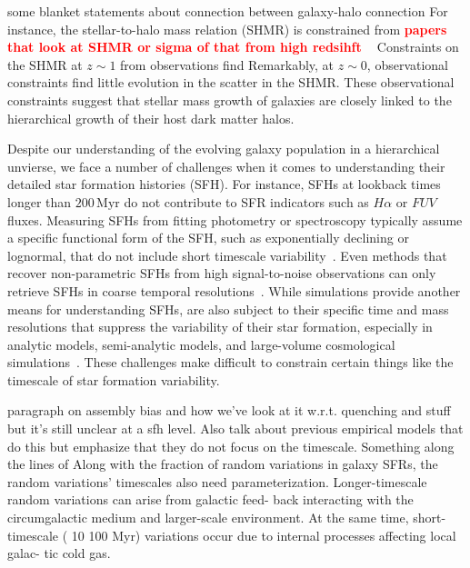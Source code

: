 \documentclass[12pt, letterpaper, preprint, tighten]{aastex62}
\newcommand{\todo}[1]{{\bf \textcolor{red}{#1}}}
\newcommand{\ch}[1]{\color{orange}{\bf CH:} #1}
\begin{document}
{\ch some blanket statements about connection between galaxy-halo connection} 
For instance, the stellar-to-halo mass relation (SHMR) is constrained
from 
\todo{papers that look at SHMR or sigma of that from high redsihft }
~\citep{mandelbaum2006a, conroy2007, more2011, leauthaud2012, tinker2013, velander2014, han2015, zu2015, gu2016}
Constraints on the SHMR at $z\sim 1$ from observations find 
Remarkably, at $z\sim 0$, observational constraints find little 
evolution in the scatter in the SHMR. 
These observational constraints suggest that stellar mass growth 
of galaxies are closely linked to the hierarchical growth of their 
host dark matter halos. 

Despite our understanding of the evolving galaxy population in a
hierarchical unvierse, we face a number of challenges when it comes 
to understanding their detailed star formation histories (SFH). 
For instance, SFHs at lookback times longer than $200\,\mathrm{Myr}$ 
do not contribute to SFR indicators such as $H\alpha$ or $FUV$ fluxes.
Measuring SFHs from fitting photometry or spectroscopy typically 
assume a specific functional form of the SFH, such as exponentially 
declining or lognormal, that do not include short timescale 
variability~\citep[\emph{e.g.}][]{wilkinson2017, carnall2018}. 
Even methods that recover non-parametric SFHs from high signal-to-noise 
observations can only retrieve SFHs in coarse temporal resolutions~\citep[\emph{e.g.}][]{tojeiro2009, leja2018a}. 
While simulations provide another means for understanding SFHs, 
are also subject to their specific time and mass resolutions that 
suppress the variability of their star formation, especially in 
analytic models, semi-analytic models, and large-volume cosmological 
simulations~\citep{sparre2017a}. These challenges make difficult to constrain certain things like 
the timescale of star formation variability.

{\ch paragraph on assembly bias and how we've look at it w.r.t. 
quenching and stuff but it's still unclear at a sfh level. Also 
talk about previous empirical models that do this but emphasize
that they do not focus on the timescale. Something along the lines of 
Along with the fraction of random variations in galaxy SFRs, the random 
variations’ timescales also need parameterization. Longer-timescale random variations can arise from galactic feed- back interacting with the circumgalactic medium and larger-scale environment. At the same time, short-timescale ( 10 100 Myr) variations occur due to internal processes affecting local galac- tic cold gas.}
\end{document}
